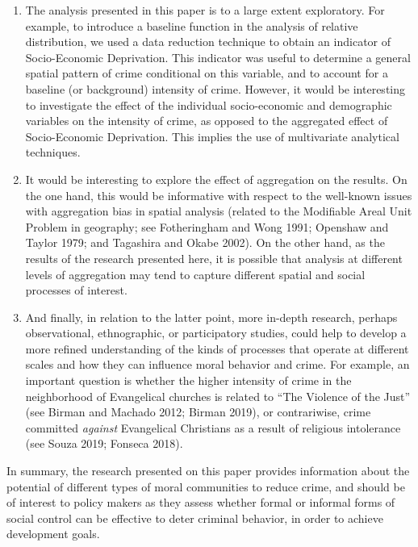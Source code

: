 \documentclass[smallextended]{svjour3}       %
\begin{document}
\begin{enumerate}
\def\labelenumi{\arabic{enumi}.}
\item
  The analysis presented in this paper is to a large extent exploratory.
  For example, to introduce a baseline function in the analysis of
  relative distribution, we used a data reduction technique to obtain an
  indicator of Socio-Economic Deprivation. This indicator was useful to
  determine a general spatial pattern of crime conditional on this
  variable, and to account for a baseline (or background) intensity of
  crime. However, it would be interesting to investigate the effect of
  the individual socio-economic and demographic variables on the
  intensity of crime, as opposed to the aggregated effect of
  Socio-Economic Deprivation. This implies the use of multivariate
  analytical techniques.
\item
  It would be interesting to explore the effect of aggregation on the
  results. On the one hand, this would be informative with respect to
  the well-known issues with aggregation bias in spatial analysis
  (related to the Modifiable Areal Unit Problem in geography; see
  Fotheringham and Wong 1991; Openshaw and Taylor 1979; and Tagashira
  and Okabe 2002). On the other hand, as the results of the research
  presented here, it is possible that analysis at different levels of
  aggregation may tend to capture different spatial and social processes
  of interest.
\item
  And finally, in relation to the latter point, more in-depth research,
  perhaps observational, ethnographic, or participatory studies, could
  help to develop a more refined understanding of the kinds of processes
  that operate at different scales and how they can influence moral
  behavior and crime. For example, an important question is whether the
  higher intensity of crime in the neighborhood of Evangelical churches
  is related to ``The Violence of the Just'' (see Birman and Machado
  2012; Birman 2019), or contrariwise, crime committed \emph{against}
  Evangelical Christians as a result of religious intolerance (see Souza
  2019; Fonseca 2018).
\end{enumerate}

In summary, the research presented on this paper provides information
about the potential of different types of moral communities to reduce
crime, and should be of interest to policy makers as they assess whether
formal or informal forms of social control can be effective to deter
criminal behavior, in order to achieve development goals.
\end{document}
